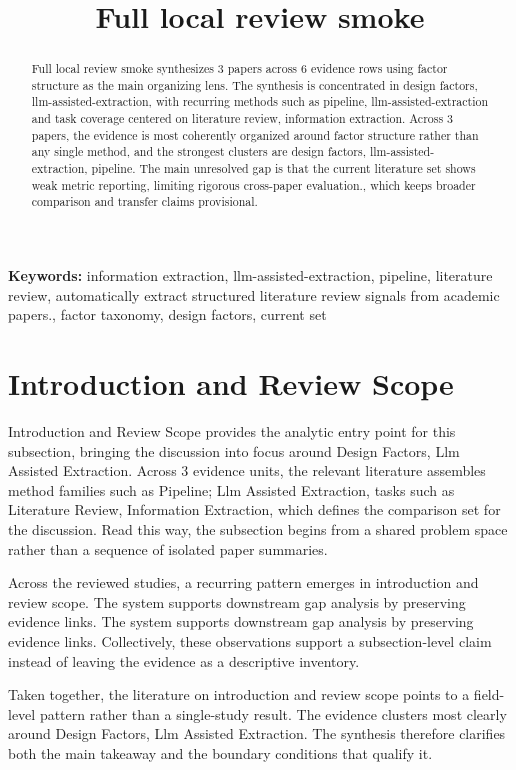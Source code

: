 \documentclass{article}
\title{Full local review smoke}
\begin{document}
\maketitle
\begin{abstract}
Full local review smoke synthesizes 3 papers across 6 evidence rows using factor structure as the main organizing lens. The synthesis is concentrated in design factors, llm-assisted-extraction, with recurring methods such as pipeline, llm-assisted-extraction and task coverage centered on literature review, information extraction. Across 3 papers, the evidence is most coherently organized around factor structure rather than any single method, and the strongest clusters are design factors, llm-assisted-extraction, pipeline. The main unresolved gap is that the current literature set shows weak metric reporting, limiting rigorous cross-paper evaluation., which keeps broader comparison and transfer claims provisional.
\end{abstract}
\noindent\textbf{Keywords:} information extraction, llm-assisted-extraction, pipeline, literature review, automatically extract structured literature review signals from academic papers., factor taxonomy, design factors, current set
\section{Introduction and Review Scope}
Introduction and Review Scope provides the analytic entry point for this subsection, bringing the discussion into focus around Design Factors, Llm Assisted Extraction. Across 3 evidence units, the relevant literature assembles method families such as Pipeline; Llm Assisted Extraction, tasks such as Literature Review, Information Extraction, which defines the comparison set for the discussion. Read this way, the subsection begins from a shared problem space rather than a sequence of isolated paper summaries. \cite{02_2003_brosseau_trf,01_2001_hamed_safety_science}

Across the reviewed studies, a recurring pattern emerges in introduction and review scope. The system supports downstream gap analysis by preserving evidence links. The system supports downstream gap analysis by preserving evidence links. Collectively, these observations support a subsection-level claim instead of leaving the evidence as a descriptive inventory. \cite{02_2003_brosseau_trf,01_2001_hamed_safety_science,03_2006_yang_tra}

Taken together, the literature on introduction and review scope points to a field-level pattern rather than a single-study result. The evidence clusters most clearly around Design Factors, Llm Assisted Extraction. The synthesis therefore clarifies both the main takeaway and the boundary conditions that qualify it. \cite{02_2003_brosseau_trf,01_2001_hamed_safety_science}
\end{document}
